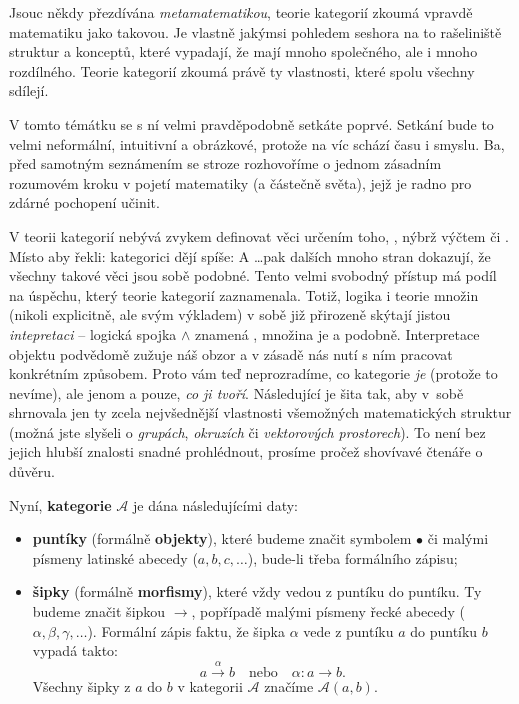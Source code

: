 \documentclass[letterpaper,11pt,leqno]{article}
\begin{document}
Jsouc někdy přezdívána \emph{metamatematikou}, teorie kategorií zkoumá vpravdě
matematiku jako takovou. Je vlastně jakýmsi pohledem seshora na to rašeliniště
struktur a konceptů, které vypadají, že mají mnoho společného, ale i mnoho
rozdílného. Teorie kategorií zkoumá právě ty vlastnosti, které spolu všechny
sdílejí.

V tomto témátku se s ní velmi pravděpodobně setkáte poprvé. Setkání bude to
velmi neformální, intuitivní a obrázkové, protože na víc schází času i smyslu.
Ba, před samotným seznámením se stroze rozhovoříme o jednom zásadním rozumovém
kroku v pojetí matematiky (a částečně světa), jejž je radno pro zdárné pochopení
učinit.

V teorii kategorií nebývá zvykem definovat věci určením toho, ,
nýbrž výčtem  či .
Místo aby řekli:  kategorici dějí spíše:  A \dots pak dalších mnoho stran
dokazují, že všechny takové věci jsou sobě podobné. Tento velmi svobodný přístup
má podíl na úspěchu, který teorie kategorií zaznamenala. Totiž, logika i teorie
množin (nikoli explicitně, ale svým výkladem) v sobě již přirozeně skýtají
jistou \emph{intepretaci} -- logická spojka $ \wedge $ znamená ,
množina je  a podobně. Interpretace
objektu podvědomě zužuje náš obzor a v zásadě nás nutí s ním pracovat konkrétním
způsobem. Proto vám teď neprozradíme, co kategorie \emph{je} (protože to
nevíme), ale jenom a pouze, \emph{co ji tvoří}. Následující  je
šita tak, aby v~sobě shrnovala jen ty zcela nejvšednější vlastnosti všemožných
matematických struktur (možná jste slyšeli o \emph{grupách}, \emph{okruzích} či
\emph{vektorových prostorech}). To není bez jejich hlubší znalosti snadné
prohlédnout, prosíme pročež shovívavé čtenáře o důvěru.

Nyní, \textbf{kategorie} $\mathcal{A}$ je dána následujícími daty:
\begin{itemize}
 \item \textbf{puntíky} (formálně \textbf{objekty}), které budeme značit
  symbolem $\bullet$ či malými písmeny latinské abecedy ($a,b,c,\ldots$),
  bude-li třeba formálního zápisu;
 \item \textbf{šipky} (formálně \textbf{morfismy}), které vždy vedou z puntíku
  do puntíku. Ty budeme značit šipkou $\longrightarrow$, popřípadě malými
  písmeny řecké abecedy ($\alpha,\beta,\gamma,\ldots$). Formální zápis faktu, že
  šipka $\alpha$ vede z puntíku $a$ do puntíku $b$ vypadá takto:
  \[
   a \overset{\alpha}{\longrightarrow} b \quad \text{nebo} \quad \alpha: a \to
   b.
  \]
  Všechny šipky z $a$ do $b$ v kategorii $\mathcal{A}$ značíme
  $\mathcal{A}(a,b)$.
\end{itemize}
\end{document}
